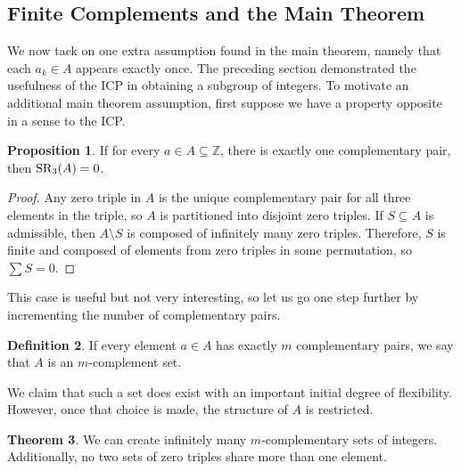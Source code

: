 \documentclass{article}
\theoremstyle{definition}
\newtheorem{theorem}{Theorem}[subsection]
\newtheorem{definition}[theorem]{Definition}
\newtheorem{prop}[theorem]{Proposition}
\newcommand{\Z}{\mathbb{Z}}
\newcommand{\SR}{\textnormal{SR}}
\begin{document}
\subsection{Finite Complements and the Main Theorem}
We now tack on one extra assumption found in the main theorem, namely that each $a_k \in A$ appears exactly once. The preceding section demonstrated the usefulness of the ICP in obtaining a subgroup of integers. To motivate an additional main theorem assumption, first suppose we have a property opposite in a sense to the ICP.
\begin{prop}
    If for every $a \in A \subseteq \Z$, there is exactly one complementary pair, then $\SR_3(A) = 0$.
\end{prop}
\begin{proof}
    Any zero triple in $A$ is the unique complementary pair for all three elements in the triple, so $A$ is partitioned into disjoint zero triples. If $S \subseteq A$ is admissible, then $A \setminus S$ is composed of infinitely many zero triples. Therefore, $S$ is finite and composed of elements from zero triples in some permutation, so $\sum S = 0$.
\end{proof}
This case is useful but not very interesting, so let us go one step further by incrementing the number of complementary pairs.
\begin{definition}
    If every element $a \in A$ has exactly $m$ complementary pairs, we say that $A$ is an $m$-complement set.
\end{definition}
We claim that such a set does exist with an important initial degree of flexibility. However, once that choice is made, the structure of $A$ is restricted.
\begin{theorem}
    We can create infinitely many $m$-complementary sets of integers. Additionally, no two sets of zero triples share more than one element.
\end{theorem}
\end{document}
